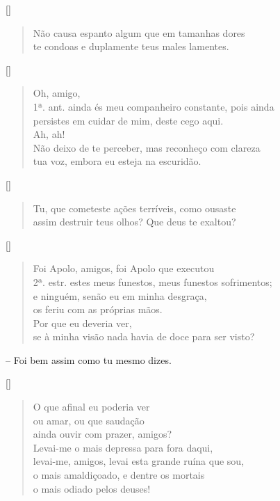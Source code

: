 \hfill [] 

\begin{verse}Não causa espanto algum que em tamanhas dores\\
te condoas e duplamente teus males lamentes. 
\end{verse}

\hfill [] 

\begin{verse}Oh, amigo,\\ 1ª. ant.
ainda és meu companheiro constante, pois ainda\\
persistes em cuidar de mim, deste cego aqui.\\
Ah, ah!\\
Não deixo de te perceber, mas reconheço com clareza\\
tua voz, embora eu esteja na escuridão.
\end{verse}


\hfill [] 

\begin{verse}Tu, que cometeste ações terríveis, como ousaste\\
assim destruir teus olhos? Que deus te exaltou?
\end{verse}

\hfill [] 

\begin{verse}Foi Apolo, amigos, foi Apolo que executou\\ 2ª. estr.
estes meus funestos, meus funestos sofrimentos;\\ 
e ninguém, senão eu em minha desgraça,\\
os feriu com as próprias mãos.\\
Por que eu deveria ver,\\
se à minha visão nada havia de doce para ser visto?
\end{verse}

 --   Foi bem assim como tu mesmo dizes.

\hfill [] 

\begin{verse}O que afinal eu poderia ver\\
ou amar, ou que saudação\\
ainda ouvir com prazer, amigos?\\ 
Levai-me o mais depressa para fora daqui,\\
levai-me, amigos, levai esta grande ruína que sou,\\
o mais amaldiçoado, e dentre os mortais\\
o mais odiado pelos deuses!
\end{verse}


